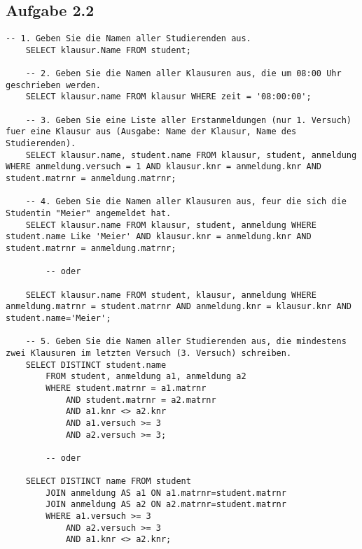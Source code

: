     \subsection{Aufgabe 2.2}
    \begin{lstlisting}[style=sqlstyle, caption={Einfügen von Datensätzen in die Tabellen STUDENT, KLAUSUR und ANMELDUNG}]
    -- 1. Geben Sie die Namen aller Studierenden aus.
    SELECT klausur.Name FROM student;
    
    -- 2. Geben Sie die Namen aller Klausuren aus, die um 08:00 Uhr geschrieben werden.
    SELECT klausur.name FROM klausur WHERE zeit = '08:00:00';

    -- 3. Geben Sie eine Liste aller Erstanmeldungen (nur 1. Versuch) fuer eine Klausur aus (Ausgabe: Name der Klausur, Name des Studierenden).
    SELECT klausur.name, student.name FROM klausur, student, anmeldung WHERE anmeldung.versuch = 1 AND klausur.knr = anmeldung.knr AND student.matrnr = anmeldung.matrnr;

    -- 4. Geben Sie die Namen aller Klausuren aus, feur die sich die Studentin "Meier" angemeldet hat.
    SELECT klausur.name FROM klausur, student, anmeldung WHERE student.name Like 'Meier' AND klausur.knr = anmeldung.knr AND student.matrnr = anmeldung.matrnr;

        -- oder

    SELECT klausur.name FROM student, klausur, anmeldung WHERE anmeldung.matrnr = student.matrnr AND anmeldung.knr = klausur.knr AND student.name='Meier';

    -- 5. Geben Sie die Namen aller Studierenden aus, die mindestens zwei Klausuren im letzten Versuch (3. Versuch) schreiben.
    SELECT DISTINCT student.name
        FROM student, anmeldung a1, anmeldung a2
        WHERE student.matrnr = a1.matrnr
            AND student.matrnr = a2.matrnr
            AND a1.knr <> a2.knr
            AND a1.versuch >= 3
            AND a2.versuch >= 3;

        -- oder
        
    SELECT DISTINCT name FROM student
        JOIN anmeldung AS a1 ON a1.matrnr=student.matrnr
        JOIN anmeldung AS a2 ON a2.matrnr=student.matrnr
        WHERE a1.versuch >= 3
            AND a2.versuch >= 3
            AND a1.knr <> a2.knr;   
    \end{lstlisting}
    